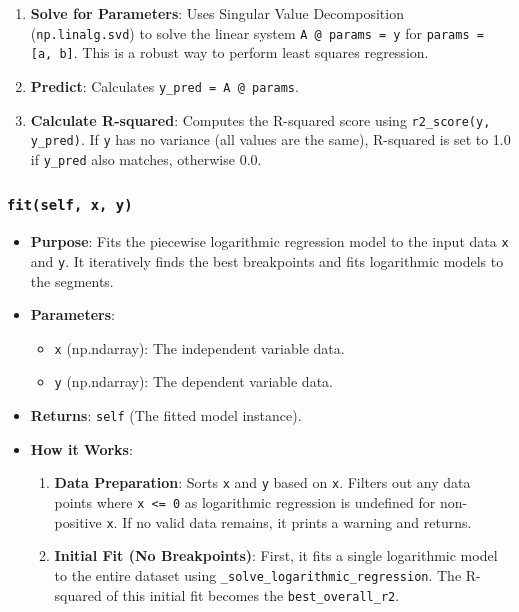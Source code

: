 \documentclass[12pt,a4paper]{report}
\begin{document}
{\begin{itemize}
\begin{enumerate}
            \item \textbf{Solve for Parameters}: Uses Singular Value Decomposition (\texttt{np.linalg.svd}) to solve the linear system \texttt{A @ params = y} for \texttt{params = [a, b]}. This is a robust way to perform least squares regression.
            \item \textbf{Predict}: Calculates \texttt{y\_pred = A @ params}.
            \item \textbf{Calculate R-squared}: Computes the R-squared score using \texttt{r2\_score(y, y\_pred)}. If \texttt{y} has no variance (all values are the same), R-squared is set to 1.0 if \texttt{y\_pred} also matches, otherwise 0.0.
        \end{enumerate}
\end{itemize}

\subsubsection{\texttt{fit(self, x, y)}}
\begin{itemize}
    \item \textbf{Purpose}: Fits the piecewise logarithmic regression model to the input data \texttt{x} and \texttt{y}. It iteratively finds the best breakpoints and fits logarithmic models to the segments.
    \item \textbf{Parameters}:
        \begin{itemize}
            \item \texttt{x} (np.ndarray): The independent variable data.
            \item \texttt{y} (np.ndarray): The dependent variable data.
        \end{itemize}
    \item \textbf{Returns}: \texttt{self} (The fitted model instance).
    \item \textbf{How it Works}:
        \begin{enumerate}
            \item \textbf{Data Preparation}: Sorts \texttt{x} and \texttt{y} based on \texttt{x}. Filters out any data points where \texttt{x <= 0} as logarithmic regression is undefined for non-positive \texttt{x}. If no valid data remains, it prints a warning and returns.
            \item \textbf{Initial Fit (No Breakpoints)}: First, it fits a single logarithmic model to the entire dataset using \texttt{\_solve\_logarithmic\_regression}. The R-squared of this initial fit becomes the \texttt{best\_overall\_r2}.

\end{enumerate}
\end{itemize}}
\end{document}
